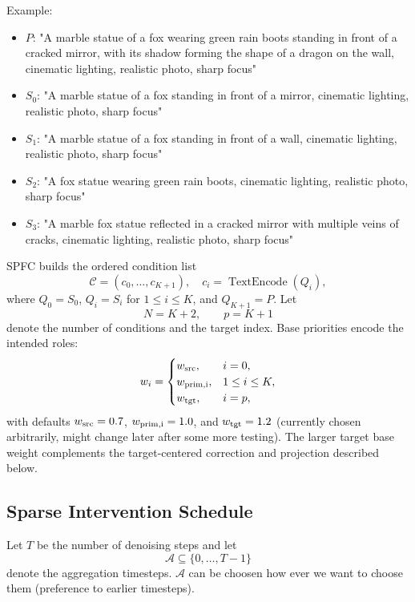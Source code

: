 \documentclass[letterpaper]{article} %
\newcommand{\TextEncode}{\operatorname{TextEncode}}
\begin{document}
Example:
\begin{itemize}
    \item $P$: "A marble statue of a fox wearing green rain boots standing in front of a cracked mirror, with its shadow forming the shape of a dragon on the wall, cinematic lighting, realistic photo, sharp focus"
    \item $S_0$: "A marble statue of a fox standing in front of a mirror, cinematic lighting, realistic photo, sharp focus"
    \item $S_1$: "A marble statue of a fox standing in front of a wall, cinematic lighting, realistic photo, sharp focus"
    \item $S_2$: "A fox statue wearing green rain boots, cinematic lighting, realistic photo, sharp focus"
    \item $S_3$: "A marble fox statue reflected in a cracked mirror with multiple veins of cracks, cinematic lighting, realistic photo, sharp focus"
\end{itemize}

SPFC builds the ordered condition list
\begin{equation}
\mathcal{C}=(c_0,\ldots,c_{K+1}),\quad
c_i=\TextEncode(Q_i),
\end{equation}
where $Q_0=S_0$, $Q_i=S_i$ for $1\leq i\leq K$, and
$Q_{K+1}=P$. Let
\begin{equation}
N=K+2,\qquad p=K+1
\end{equation}
denote the number of conditions and the target index. Base priorities
encode the intended roles:
\begin{equation}
w_i=
\begin{cases}
w_{\rm src}, & i=0,\\
w_{\rm prim,i}, & 1\leq i\leq K,\\
w_{\rm tgt}, & i=p,
\end{cases}
\end{equation}
with defaults $w_{\rm src}=0.7$, $w_{\rm prim,i}=1.0$, and
$w_{\rm tgt}=1.2$ (currently chosen arbitrarily, might change later after some more testing). The larger target base weight complements the target-centered correction and projection described below.

\subsection{Sparse Intervention Schedule}

Let $T$ be the number of denoising steps and let
\[
\mathcal{A}\subseteq\{0,\ldots,T-1\}
\]
denote the aggregation timesteps. $\mathcal{A}$ can be choosen how ever we want to choose them (preference to earlier timesteps).
\end{document}

